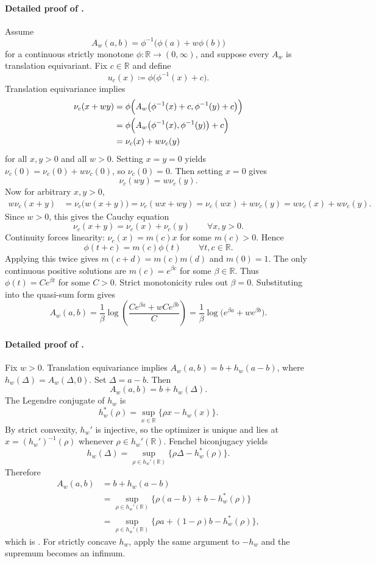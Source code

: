 \documentclass{article}
\theoremstyle{remark}
\newcommand{\R}{\mathbb{R}}
\newcommand{\defeq}{\coloneqq}
\begin{document}
\paragraph{Detailed proof of .}
Assume
\[
A_w(a,b)=\phi^{-1}\!\bigl(\phi(a)+w\phi(b)\bigr)
\]
for a continuous strictly monotone $\phi:\R\to(0,\infty)$, and suppose every $A_w$ is translation equivariant.
Fix $c\in\R$ and define
\[
u_c(x)\defeq \phi\bigl(\phi^{-1}(x)+c\bigr).
\]
Translation equivariance implies
\begin{align*}
\nu_c(x+w y)
&=\phi\Bigl(A_w\bigl(\phi^{-1}(x)+c,\phi^{-1}(y)+c\bigr)\Bigr)\\
&=\phi\Bigl(A_w\bigl(\phi^{-1}(x),\phi^{-1}(y)\bigr)+c\Bigr)\\
&=\nu_c(x)+w\nu_c(y)
\end{align*}
for all $x,y>0$ and all $w>0$.
Setting $x=y=0$ yields $\nu_c(0)=\nu_c(0)+w\nu_c(0)$, so $\nu_c(0)=0$.
Then setting $x=0$ gives
\[
\nu_c(wy)=w\nu_c(y).
\]
Now for arbitrary $x,y>0$,
\begin{align*}
w\nu_c(x+y)
&=\nu_c\bigl(w(x+y)\bigr)
 = \nu_c(wx+wy)
 = \nu_c(wx)+w\nu_c(y)
 = w\nu_c(x)+w\nu_c(y).
\end{align*}
Since $w>0$, this gives the Cauchy equation
\[
\nu_c(x+y)=\nu_c(x)+\nu_c(y)
\qquad \forall x,y>0.
\]
Continuity forces linearity: $\nu_c(x)=m(c)x$ for some $m(c)>0$.
Hence
\[
\phi(t+c)=m(c)\phi(t)
\qquad \forall t,c\in\R.
\]
Applying this twice gives $m(c+d)=m(c)m(d)$ and $m(0)=1$.
The only continuous positive solutions are $m(c)=e^{\beta c}$ for some $\beta\in\R$.
Thus $\phi(t)=Ce^{\beta t}$ for some $C>0$.
Strict monotonicity rules out $\beta=0$.
Substituting into the quasi-sum form gives
\[
A_w(a,b)=\frac{1}{\beta}\log\!\left(\frac{Ce^{\beta a}+wCe^{\beta b}}{C}\right)=\frac{1}{\beta}\log\!\bigl(e^{\beta a}+w e^{\beta b}\bigr).
\]

\paragraph{Detailed proof of .}
Fix $w>0$.
Translation equivariance implies $A_w(a,b)=b+h_w(a-b)$, where $h_w(\Delta)=A_w(\Delta,0)$.
Set $\Delta=a-b$.
Then
\[
A_w(a,b)=b+h_w(\Delta).
\]
The Legendre conjugate of $h_w$ is
\[
h_w^*(\rho)=\sup_{x\in\R}\{\rho x-h_w(x)\}.
\]
By strict convexity, $h_w'$ is injective, so the optimizer is unique and lies at $x=(h_w')^{-1}(\rho)$ whenever $\rho\in h_w'(\R)$.
Fenchel biconjugacy yields
\[
h_w(\Delta)=\sup_{\rho\in h_w'(\R)}\{\rho\Delta-h_w^*(\rho)\}.
\]
Therefore
\begin{align*}
A_w(a,b)
&=b+h_w(a-b)\\
&=\sup_{\rho\in h_w'(\R)}\{\rho(a-b)+b-h_w^*(\rho)\}\\
&=\sup_{\rho\in h_w'(\R)}\{\rho a +(1-\rho)b-h_w^*(\rho)\},
\end{align*}
which is .
For strictly concave $h_w$, apply the same argument to $-h_w$ and the supremum becomes an infimum.
\end{document}
